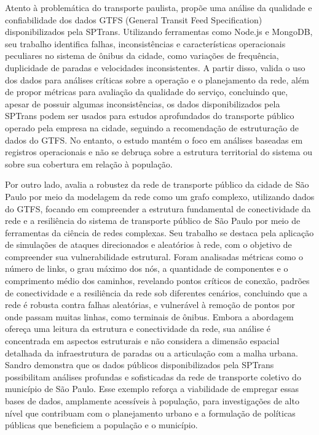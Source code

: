 Atento à problemática do transporte paulista, \citet{tcc:Andre} propõe uma análise da qualidade e confiabilidade dos dados GTFS (General Transit Feed Specification) disponibilizados pela SPTrans. Utilizando ferramentas como Node.js e MongoDB, seu trabalho identifica falhas, inconsistências e características operacionais peculiares no sistema de ônibus da cidade, como variações de frequência, duplicidade de paradas e velocidades inconsistentes. A partir disso, valida o uso dos dados para análises críticas sobre a operação e o planejamento da rede, além de propor métricas para avaliação da qualidade do serviço, concluindo que, apesar de possuir algumas inconsistências, os dados disponibilizados pela SPTrans podem ser usados para estudos aprofundados do transporte público operado pela empresa na cidade, seguindo a recomendação de estruturação de dados do GTFS. No entanto, o estudo mantém o foco em análises baseadas em registros operacionais e não se debruça sobre a estrutura territorial do sistema ou sobre sua cobertura em relação à população.

Por outro lado, \citet{tese:sandro} avalia a robustez da rede de transporte público da cidade de São Paulo por meio da modelagem da rede como um grafo complexo, utilizando dados do GTFS, focando em compreender a estrutura fundamental de conectividade da rede e a resiliência do sistema de transporte público de São Paulo por meio de ferramentas da ciência de redes complexas. Seu trabalho se destaca pela aplicação de simulações de ataques direcionados e aleatórios à rede, com o objetivo de compreender sua vulnerabilidade estrutural. Foram analisadas métricas como o número de links, o grau máximo dos nós, a quantidade de componentes e o comprimento médio dos caminhos, revelando pontos críticos de conexão, padrões de conectividade e a resiliência da rede sob diferentes cenários, concluindo que a rede é robusta contra falhas aleatórias, e vulnerável à remoção de pontos por onde passam muitas linhas, como terminais de ônibus. Embora a abordagem ofereça uma leitura da estrutura e conectividade da rede, sua análise é concentrada em aspectos estruturais e não considera a dimensão espacial detalhada da infraestrutura de paradas ou a articulação com a malha urbana. Sandro demonstra que os dados públicos disponibilizados pela SPTrans possibilitam análises profundas e sofisticadas da rede de transporte coletivo do município de São Paulo. Esse exemplo reforça a viabilidade de empregar essas bases de dados, amplamente acessíveis à população, para investigações de alto nível que contribuam com o planejamento urbano e a formulação de políticas públicas que beneficiem a população e o município.

